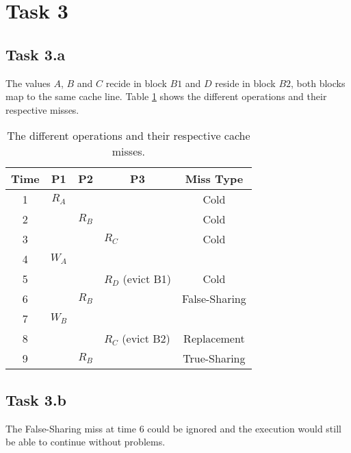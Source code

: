 \section{Task 3}
\subsection{Task 3.a}


The values $A$, $B$ and $C$ recide in block $B1$ and $D$ reside in block $B2$,
both blocks map to the same cache line. Table \ref{tab:t3a} shows the different
operations and their respective misses.

\begin{table}[]
\centering
\begin{tabular}{ccccc}
Time                   & P1    & P2    & P3                                    & Miss Type     \\ \hline
\multicolumn{1}{c|}{1} & $R_A$ &       & \multicolumn{1}{l|}{}                 & Cold          \\
\multicolumn{1}{c|}{2} &       & $R_B$ & \multicolumn{1}{l|}{}                 & Cold          \\
\multicolumn{1}{c|}{3} &       &       & \multicolumn{1}{l|}{$R_C$}            & Cold          \\
\multicolumn{1}{c|}{4} & $W_A$ &       & \multicolumn{1}{l|}{}                 &               \\
\multicolumn{1}{c|}{5} &       &       & \multicolumn{1}{l|}{$R_D$ (evict B1)} & Cold          \\
\multicolumn{1}{c|}{6} &       & $R_B$ & \multicolumn{1}{l|}{}                 & False-Sharing \\
\multicolumn{1}{c|}{7} & $W_B$ &       & \multicolumn{1}{l|}{}                 &               \\
\multicolumn{1}{c|}{8} &       &       & \multicolumn{1}{l|}{$R_C$ (evict B2)} & Replacement   \\
\multicolumn{1}{c|}{9} &       & $R_B$ & \multicolumn{1}{l|}{}                 & True-Sharing
\end{tabular}
\caption{The different operations and their respective cache misses.}
\label{tab:t3a}
\end{table}

\subsection{Task 3.b}
The False-Sharing miss at time $6$ could be ignored and the execution would
still be able to continue without problems.
